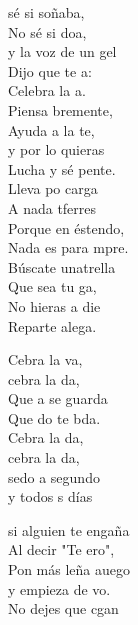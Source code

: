 \begin{cancion}%
	 sé si soñaba,\\
	No sé si doa, \\
	y la voz de un gel\\
	Dijo que te a:\\
	Celebra la a.   \\
	Piensa bremente,\\
	Ayuda a la te,\\
	y por lo  quieras\\
	Lucha y sé pente.\\
	Lleva po carga\\
	A nada tferres\\
	Porque en éstendo,\\
	Nada es para mpre.\\
	Búscate unatrella\\
	Que sea tu ga, \\
	No hieras a die\\
	Reparte alega.\jump\\
	\begin{chorus}%
		Cebra la va, \\
		cebra la da,\\
		Que a se guarda\\
		Que do te bda.\\
	\jump
		Cebra la da, \\
		cebra la da,\\
		sedo a segundo\\
		y todos s días\jump\\
	\end{chorus}%
	si alguien te engaña\\
	Al decir "Te ero",\\
	Pon más leña auego\\
	y empieza de vo.\\
	No dejes que cgan\\

\end{cancion}
